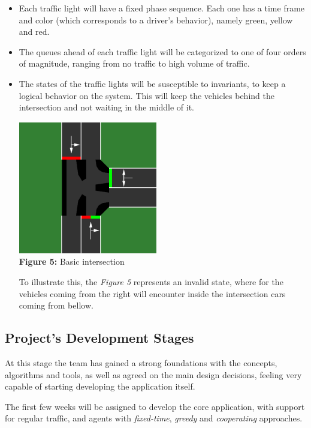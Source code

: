 \documentclass[10pt,a4paper]{article}
\begin{document}
\begin{itemize}
\item	Each traffic light will have a fixed phase sequence. Each one has a time frame and color (which corresponds to a driver's behavior), namely green, yellow and red.
    
\item 	The queues ahead of each traffic light will be categorized to one of four orders of magnitude, ranging from no traffic to high volume of traffic.
    
\item	The states of the traffic lights will be susceptible to invariants, to keep a logical behavior on the system. This will keep the vehicles behind the intersection and not waiting in the middle of it.
    
\begin{center}
    \includegraphics[width=0.5 \textwidth]{snapshot3.png} \\
    \textbf{Figure 5:} Basic intersection
\end{center}

	To illustrate this, the \textit{Figure 5} represents an invalid state, where for the vehicles coming from the right will encounter inside the intersection cars coming from bellow.


\end{itemize}
\newpage

\subsection{Project's Development Stages}

	At this stage the team has gained a strong foundations with the concepts, algorithms and tools, as well as agreed on the main design decisions, feeling very capable of starting developing the application itself.
    
    The first few weeks will be assigned to develop the core application, with support for regular traffic, and agents with \textit{fixed-time}, \textit{greedy} and \textit{cooperating} approaches.
    
\end{document}

